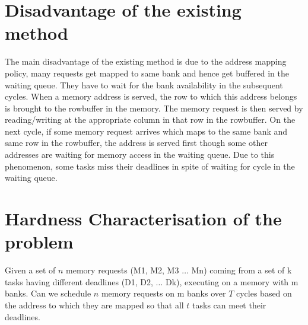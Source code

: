 \section{Disadvantage of the existing method}\label{dotam}
\noindent
The main disadvantage of the existing method is due to the address mapping policy, many requests get mapped to same bank and 
hence get buffered in the waiting queue. They have to wait for the bank availability in the subsequent cycles. When a memory
address is served, the row to which this address belongs is brought to the rowbuffer in the memory. The memory request is 
then served by reading/writing at the appropriate column in that row in the rowbuffer. On the next cycle, if some memory 
request arrives which maps to the same bank and same row in the rowbuffer, the address is served first though some other 
addresses are waiting for memory access in the waiting queue. Due to this phenomenon, some tasks miss their deadlines in spite
of waiting for cycle in the waiting queue. 

\section{Hardness Characterisation of the problem}\label{hcotp}
\noindent
\begin{problem}
 Given a set of $n$ memory requests (M1, M2, M3 $\dots$ Mn) coming from a set of k tasks having different deadlines
 (D1, D2, $\dots$ Dk), executing on a memory with m banks. Can we schedule $n$ memory requests on m banks over $T$ cycles based 
 on the address to which they are mapped so that all $t$ tasks can meet their deadlines.
\end{problem}

